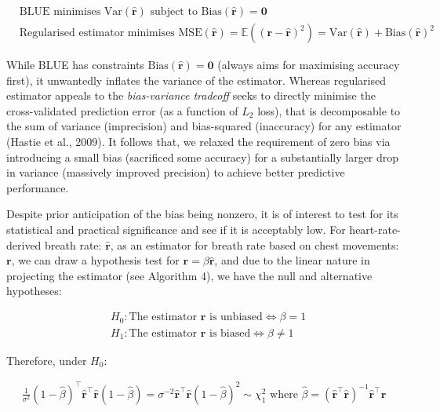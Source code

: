 \documentclass[
]{article}
\begin{document}
\begin{align*}
  &\text{BLUE minimises Var} (\mathbf{\hat{r}}) \text{ subject to Bias} (\mathbf{\hat{r}}) = \mathbf{0} \\
  &\text{Regularised estimator minimises MSE} (\mathbf{\hat{r}}) = \mathbb{E}((\mathbf{r} - \mathbf{\hat{r}})^2) = \text{Var}(\mathbf{\hat{r}}) + \text{Bias}(\mathbf{\hat{r}})^2
\end{align*}

While BLUE has constraints
\(\text{Bias}(\mathbf{\hat{r}}) = \mathbf{0}\) (always aims for
maximising accuracy first), it unwantedly inflates the variance of the
estimator. Whereas regularised estimator appeals to the
\emph{bias-variance tradeoff} seeks to directly minimise the
cross-validated prediction error (as a function of \(L_2\) loss), that
is decomposable to the sum of variance (imprecision) and bias-squared
(inaccuracy) for any estimator (Hastie et al., 2009). It follows that,
we relaxed the requirement of zero bias via introducing a small bias
(sacrificed some accuracy) for a substantially larger drop in variance
(massively improved precision) to achieve better predictive performance.

Despite prior anticipation of the bias being nonzero, it is of interest
to test for its statistical and practical significance and see if it is
acceptably low. For heart-rate-derived breath rate:
\(\mathbf{\hat{r}}\), as an estimator for breath rate based on chest
movements: \(\mathbf{r}\), we can draw a hypothesis test for
\(\mathbf{r} = \beta\mathbf{\hat{r}}\), and due to the linear nature in
projecting the estimator (see Algorithm 4), we have the null and
alternative hypotheses:

\begin{align*}
  &H_0: \text{The estimator } \mathbf{\hat{r}} \text{ is unbiased} \iff \beta = 1 \\
  &H_1: \text{The estimator } \mathbf{\hat{r}} \text{ is biased} \iff \beta \neq 1
\end{align*}

Therefore, under \(H_0:\)

\begin{align*}
  \frac{1}{\sigma^2}(1 - \hat{\beta})^\top\mathbf{\hat{r}}^\top\mathbf{\hat{r}}(1 - \hat{\beta}) = \sigma^{-2}\mathbf{\hat{r}}^\top\mathbf{\hat{r}}(1 - \hat{\beta})^2 \sim \chi_1^2 \text{ where } \hat{\beta} = (\mathbf{\hat{r}}^\top\mathbf{\hat{r}})^{-1}\mathbf{\hat{r}}^\top\mathbf{r}
\end{align*}
\end{document}
